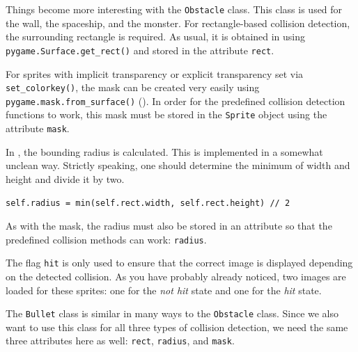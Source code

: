 
Things become more interesting with the \texttt{Obstacle} class. This class is used for the wall, the spaceship, and the monster.  For rectangle-based collision detection, the surrounding rectangle is required. As usual, it is obtained in  using \texttt{pygame.Surface.get\-\_rect()} and stored in the attribute \texttt{rect}.  

For sprites with implicit transparency or explicit transparency set via \texttt{set\_colorkey()}, the mask can be created very easily using \texttt{pygame.mask.from\_surface()} (). In order for the predefined collision detection functions to work, this mask must be stored in the \texttt{Sprite} object using the attribute \texttt{mask}.  

In , the bounding radius is calculated. This is implemented in a somewhat unclean way. Strictly speaking, one should determine the minimum of width and height and divide it by two. 

\lstset{firstnumber=15}
\begin{lstlisting}
self.radius = min(self.rect.width, self.rect.height) // 2
\end{lstlisting}

As with the mask, the radius must also be stored in an attribute so that the predefined collision methods can work: \texttt{radius}.  

The flag \texttt{hit} is only used to ensure that the correct image is displayed depending on the detected collision. As you have probably already noticed, two images are loaded for these sprites: one for the \emph{not hit} state and one for the \emph{hit} state.


The \texttt{Bullet} class is similar in many ways to the \texttt{Obstacle} class. Since we also want to use this class for all three types of collision detection, we need the same three attributes here as well: \texttt{rect}, \texttt{radius}, and \texttt{mask}.  

